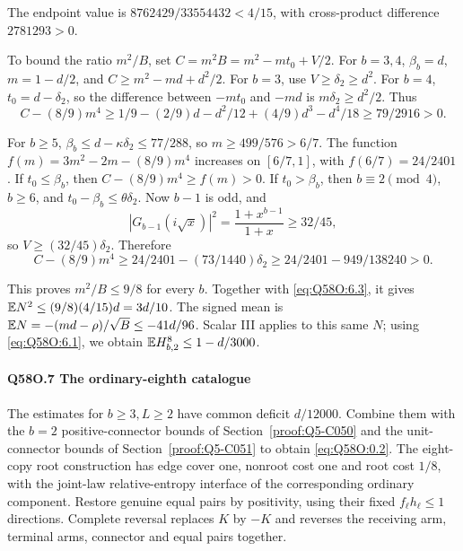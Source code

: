 The endpoint value is \(8762429/33554432<\allowbreak 4/15\), with cross-product difference \(2781293>\allowbreak 0\).

To bound the ratio \(m^2/B\), set
\(C=\allowbreak m^2B=\allowbreak m^2-mt_0+V/2\).
For \(b=\allowbreak 3,\allowbreak 4\), \(\beta_b=\allowbreak d\), \(m=\allowbreak 1-d/2\), and
\(C\ge\allowbreak  m^2-md+d^2/2\).
For \(b=\allowbreak 3\), use \(V\ge\allowbreak \delta_2\ge\allowbreak  d^2\).
For \(b=\allowbreak 4\), \(t_0=\allowbreak d-\delta_2\), so the difference between
\(-mt_0\) and \(-md\) is \(m\delta_2\ge\allowbreak  d^2/2\).
Thus
\[
C-(8/9)m^4\ge1/9-(2/9)d-d^2/12+(4/9)d^3-d^4/18
\ge79/2916>0.
\]

For \(b\ge\allowbreak 5\), \(\beta_b\le\allowbreak  d-\kappa\delta_2\le\allowbreak 77/288\), so
\(m\ge\allowbreak 499/576>\allowbreak 6/7\).
The function \(f(m)=\allowbreak 3m^2-2m-(8/9)m^4\) increases on \([6/7,\allowbreak 1]\), with
\(f(6/7)=\allowbreak 24/2401\).
If \(t_0\le\allowbreak \beta_b\), then
\(C-(8/9)m^4\ge\allowbreak  f(m)>\allowbreak 0\).
If \(t_0>\allowbreak \beta_b\), then \(b\equiv2\pmod4\), \(b\ge\allowbreak 6\), and
\(t_0-\beta_b\le\allowbreak \theta\delta_2\).
Now \(b-1\) is odd, and
\[
|G_{b-1}(i\sqrt x)|^2=\frac{1+x^{b-1}}{1+x}\ge32/45,
\]
so \(V\ge\allowbreak (32/45)\delta_2\). Therefore
\[
C-(8/9)m^4\ge24/2401-(73/1440)\delta_2
\ge24/2401-949/138240>0.
\tag{Q58O.6.4}\label{eq:Q58O:6.4}
\]

This proves \(m^2/B\le\allowbreak 9/8\) for every \(b\).
Together with \eqref{eq:Q58O:6.3}, it gives
\(\mathbb E N^2\le\allowbreak (9/8)(4/15)d=\allowbreak 3d/10\).
The signed mean is
\(\mathbb E N=\allowbreak -(md-\rho)/\sqrt B\le\allowbreak -41d/96\).
Scalar III applies to this same \(N\); using \eqref{eq:Q58O:6.1}, we obtain
\(\mathbb E H_{b,\allowbreak 2}^8\le\allowbreak 1-d/3000\).

\paragraph{Q58O.7 The ordinary-eighth catalogue}
The estimates for \(b\ge\allowbreak 3,\allowbreak L\ge\allowbreak 2\) have common deficit \(d/12000\).
Combine them with the \(b=\allowbreak 2\) positive-connector bounds of Section~\ref{proof:Q5-C050} and the unit-connector bounds of Section~\ref{proof:Q5-C051} to obtain \eqref{eq:Q58O:0.2}.
The eight-copy root construction has edge cover one, nonroot cost one and root cost \(1/8\), with the joint-law relative-entropy interface of the corresponding ordinary component.
Restore genuine equal pairs by positivity, using their fixed \(f_\ell h_\ell\le\allowbreak 1\) directions.
Complete reversal replaces \(K\) by \(-K\) and reverses the receiving arm, terminal arms, connector and equal pairs together.
